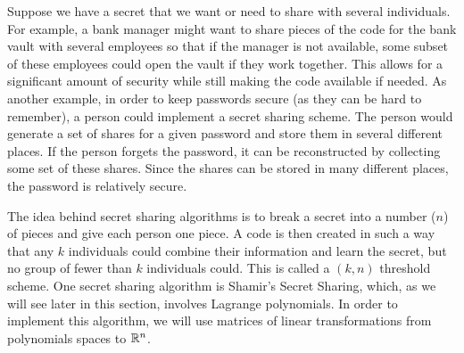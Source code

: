  \label{sec:transformation_matrix}

\vspace*{-17 pt}

\vspace*{13 pt}


Suppose we have a secret that we want or need to share with several individuals. For example, a bank manager might want to share pieces of the code for the bank vault with several employees so that if the manager is not available, some subset of these employees could open the vault if they work together. This allows for a significant amount of security while still making the code available if needed. As another example, in order to keep passwords secure (as they can be hard to remember), a person could implement a secret sharing scheme. The person would generate a set of shares for a given password and store them in several different places. If the person forgets the password, it can be reconstructed by collecting some set of these shares. Since the shares can be stored in many different places, the password is relatively secure.  

The idea behind secret sharing algorithms is to break a secret into a number ($n$) of pieces and give each person one piece. A code is then created in such a way that any $k$ individuals could combine their information and learn the secret, but no group of fewer than $k$ individuals could. This is called a $(k,n)$ threshold scheme. One secret sharing algorithm is Shamir's Secret Sharing, which, as we will see later in this section, involves Lagrange polynomials. In order to implement this algorithm, we will use matrices of linear transformations from polynomials spaces to $\mathbb{R}^n$. 


